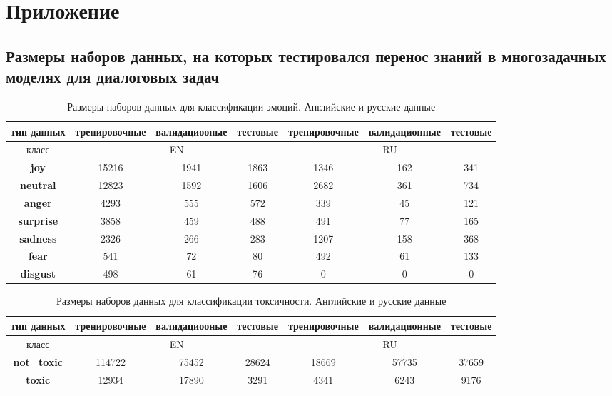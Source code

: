 \chapter{Приложение}\label{appendix}
\section{Размеры наборов данных, на которых тестировался перенос знаний в многозадачных моделях для диалоговых задач}
\label{tr-ag-sizes}
\begin{table}[t]
\label{emo_sizes}
\caption{Размеры наборов данных для классификации эмоций. Английские и русские данные}
\begin{tabular}{|c||c|c|c|c|c|c|} \hline
{тип данных} & {тренировочные} & {валидациооные} & {тестовые} & {тренировочные} & {валидационные} & {тестовые} \\ \hline
{класс} & \multicolumn{3}{c|}{EN} & \multicolumn{3}{c|}{RU} \\ \hline \hline
\textbf{joy}& 15216 & 1941 & 1863 & 1346 & 162 & 341 \\ \hline
  \textbf{neutral}& 12823 & 1592 & 1606 & 2682 & 361 & 734 \\ \hline
  \textbf{anger}& 4293 & 555 & 572 & 339 & 45 & 121 \\ \hline
  \textbf{surprise}& 3858 & 459 & 488 & 491 & 77 & 165 \\ \hline
  \textbf{sadness}& 2326 & 266 & 283 & 1207 & 158 & 368 \\ \hline
  \textbf{fear}& 541 & 72 & 80 & 492 & 61 & 133 \\ \hline
  \textbf{disgust}& 498 & 61 & 76 & 0 & 0 & 0 \\ \hline
\end{tabular}
\end{table}


\begin{table}[t]
\caption{Размеры наборов данных для классификации токсичности. Английские и русские данные}
\label{toxic_sizes}
\begin{tabular}{|c||c|c|c|c|c|c|} \hline
{тип данных} & {тренировочные} & {валидациооные} & {тестовые} & {тренировочные} & {валидационные} & {тестовые} \\ \hline
{класс} & \multicolumn{3}{c|}{EN} & \multicolumn{3}{c|}{RU} \\ \hline \hline
\textbf{not\_toxic}& 114722 &75452&28624 &18669 & 57735&37659 \\ \hline 
\textbf{toxic}& 12934 &17890 &3291 & 4341 & 6243&9176 \\ \hline 
\end{tabular}
\end{table}

